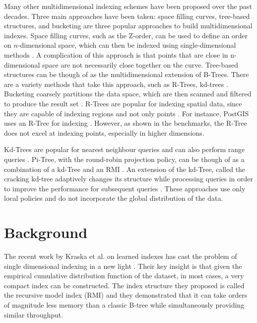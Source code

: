 \documentclass[sigconf,10pt]{acmart}
\begin{document}
Many other multidimensional indexing schemes have been proposed
over the past decades. Three main approaches have been taken:
space filling curves, tree-based structures, and bucketing are three popular approaches
to build multidimensional indexes. Space filling curves, such as the Z-order,
can be used to define an order on $n$-dimensional space, which can then be indexed using 
single-dimensional methods \cite{UB-Tree}. 
A complication of this approach is that points that are close in
n-dimensional space are not necessarily close together on the curve.
Tree-based structures can be though of as the multidimensional extension of B-Trees.
There are a variety methods that take this approach, such as R-Trees, kd-trees
\cite{R-Tree,R*-Tree,kd-Tree}.
Bucketing coarsely partitions the data space, which are then scanned and filtered to produce
the result set \cite{Grid-File,Flood}.
R-Trees are popular for indexing spatial data,
since they are capable of indexing regions and not only points \cite{R-Tree,R*-Tree}.
For instance, PostGIS uses an R-Tree for indexing \cite{PostGIS}.
However, as shown in the benchmarks, the R-Tree does not excel at 
indexing points, especially in higher dimensions.

Kd-Trees are popular for nearest neighbour queries 
and can also perform range queries \cite{kd-Tree,ModernMDRQ}.
Pi-Tree, with the round-robin projection policy, can be though of as a combination
of a kd-Tree and an RMI \cite{Learned_Index}. 
An extension of the kd-Tree, called the cracking kd-tree adaptively
changes its structure while processing queries in order to improve 
the performance for subsequent queries \cite{CrackingKD-Tree}.
These approaches use only local policies and do not incorporate the global distribution
of the data.


\section{Background}

The recent work by Kraska et al. on learned indexes
has cast the problem of single dimensional indexing in a new light \cite{Learned_Index}.
Their key insight is that given the empirical cumulative distribution function
of the dataset, in most cases, a very compact index can be constructed. 
The index structure they proposed is called the recursive model index (RMI) and they
demonstrated that it can take orders of magnitude less memory
than a classic B-tree while simultaneously providing similar throughput.
\end{document}
